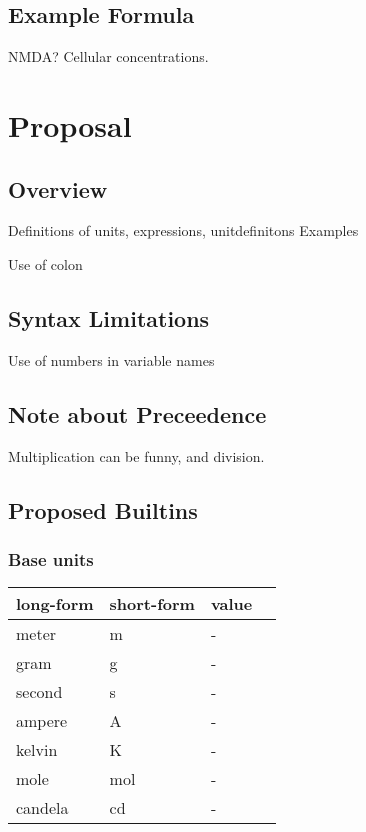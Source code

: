 \documentclass{article}
\begin{document}
\subsection{Example Formula}
\begin{description}
\item NMDA? Cellular concentrations.
\end{description}

\newpage
\section{Proposal}

\subsection{Overview}
Definitions of units, expressions, unitdefinitons
Examples

Use of colon


\subsection{Syntax Limitations}
Use of numbers in variable names

\subsection*{Note about Preceedence}
Multiplication can be funny, and division.



\newpage
\subsection{Proposed Builtins}




\subsubsection{Base units}

\begin{center}
    \begin{tabular}{ | l | l |  l | p{5cm} |}
    \hline
    long-form & short-form & value  \\ \hline
    meter & m & - \\ \hline
    gram & g & - \\ \hline
    second & s & - \\ \hline
    ampere & A & - \\ \hline
    kelvin & K & - \\ \hline
    mole & mol & - \\ \hline
    candela & cd & - \\ \hline
    \end{tabular}
\end{center}
\end{document}
